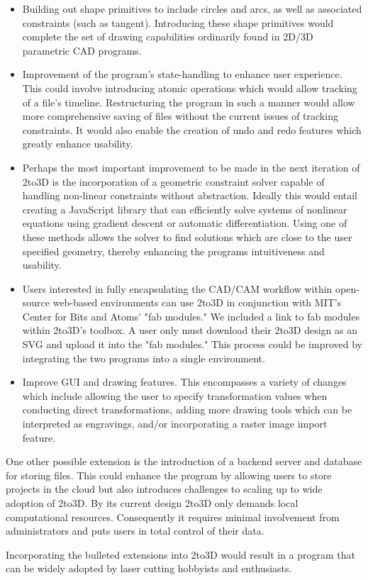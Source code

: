 \begin{itemize}
  \item Building out shape primitives to include circles and arcs, as well as associated constraints (such as tangent). Introducing these shape primitives would complete the set of drawing capabilities ordinarily found in 2D/3D parametric CAD programs.

  \item Improvement of the program's state-handling to enhance user experience. This could involve introducing atomic operations which would allow tracking of a file's timeline. Restructuring the program in such a manner would allow more comprehensive saving of files without the current issues of tracking constraints. It would also enable the creation of undo and redo features which greatly enhance usability.

  \item Perhaps the most important improvement to be made in the next iteration of 2to3D is the incorporation of a geometric constraint solver capable of handling non-linear constraints without abstraction. Ideally this would entail creating a JavaScript library that can efficiently solve systems of nonlinear equations using gradient descent or automatic differentiation. Using one of these methods allows the solver to find solutions which are close to the user specified geometry, thereby enhancing the programs intuitiveness and usability.

  \item Users interested in fully encapsulating the CAD/CAM workflow within open-source web-based environments can use 2to3D in conjunction with MIT's Center for Bits and Atoms' "fab modules." We included a link to fab modules within 2to3D's toolbox. A user only must download their 2to3D design as an SVG and upload it into the "fab modules." This process could be improved by integrating the two programs into a single environment.
  
  \item Improve GUI and drawing features. This encompasses a variety of changes which include allowing the user to specify transformation values when conducting direct transformations, adding more drawing tools which can be interpreted as engravings, and/or incorporating a raster image import feature.
\end{itemize}

One other possible extension is the introduction of a backend server and database for storing files. This could enhance the program by allowing users to store projects in the cloud but also introduces challenges to scaling up to wide adoption of 2to3D. By its current design 2to3D only demands local computational resources. Consequently it requires minimal involvement from administrators and puts users in total control of their data. 

Incorporating the bulleted extensions into 2to3D would result in a program that can be widely adopted by laser cutting hobbyists and enthusiasts.


